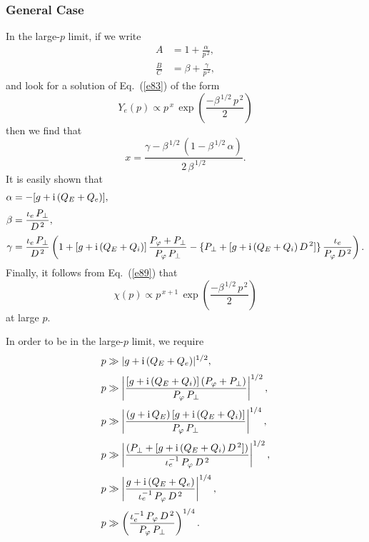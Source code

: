 \documentclass[titlepage=false,12pt]{article}
\begin{document}
\subsubsection{General Case}
In the large-$p$ limit, if we write
\begin{align}
A &=1+\frac{\alpha}{p^{\,2}},\\[0.5ex]
\frac{B}{C} &= \beta+\frac{\gamma}{p^{\,2}},
\end{align}
and
look for a solution of Eq.~(\ref{e83}) of the form
\begin{equation}
Y_e(p) \propto p^{\,x}\,\exp\left(\frac{-\beta^{\,1/2}\,p^{\,2}}{2}\right)
\end{equation}
then we find that
\begin{equation}
x = \frac{\gamma -\beta^{\,1/2}\,(1-\beta^{\,1/2}\,\alpha)}{2\,\beta^{\,1/2}}.
\end{equation}
It is easily shown that
\begin{align}
\alpha &= -[g+ {\rm i}\,(Q_E+Q_e)],\\[0.5ex]
\beta&= \frac{\iota_e\,P_\perp}{D^{\,2}},\\[0.5ex]
\gamma&= \frac{\iota_e\,P_\perp}{D^{\,2}}\left(1+ [g+{\rm i}\,(Q_E+Q_i)]\,\frac{P_\varphi+P_\perp}{P_\varphi\,P_\perp}
-\{P_\perp+[g+{\rm i}\,(Q_E+Q_i)\,D^{\,2}]\}\,\frac{\iota_e}{P_\varphi\,D^{\,2}} \right).
\end{align}
Finally, it follows from Eq.~(\ref{e89}) that
\begin{equation}
\chi(p) \propto p^{\,x+1}\,\exp\left(\frac{-\beta^{\,1/2}\,p^{\,2}}{2}\right)
\end{equation}
at large $p$. 

In order to be in the large-$p$ limit, we require
\begin{align}
p&\gg |g+{\rm i}\,(Q_E+Q_e)|^{1/2},\\[0.5ex]
p&\gg\left|\frac{[g+{\rm i}\,(Q_E+Q_i)]\,(P_\varphi + P_\perp)}{P_\varphi\,P_\perp}\right|^{1/2},\\[0.5ex]
p&\gg \left|\frac{(g+{\rm i}\,Q_E)\,[g+{\rm i}\,(Q_E+Q_i)]}{P_\varphi\,P_\perp}\right|^{1/4},\\[0.5ex]
p&\gg \left|\frac{(P_\perp+[g+{\rm i}\,(Q_E+Q_i)\,D^{\,2}])}{\iota_e^{-1}\,P_\varphi\,D^{\,2}}\right|^{1/2},\\[0.5ex]
p&\gg \left|\frac{g+{\rm i}\,(Q_E+Q_e)}{\iota_e^{-1}\,P_\varphi\,D^{\,2}}\right|^{1/4},\\[0.5ex]
p&\gg \left(\frac{\iota_e^{-1}\,P_\varphi\,D^{\,2}}{P_\varphi\,P_\perp}\right)^{1/4}.
\end{align} 
\end{document}
